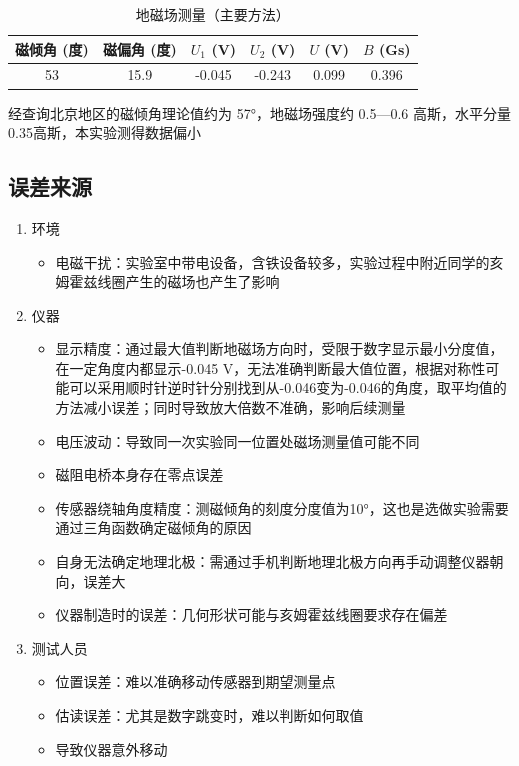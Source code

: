 \documentclass[11pt]{ctexart}
\makeatletter
\providecommand{\tightlist}{%
      \setlength{\itemsep}{0pt}\setlength{\parskip}{0pt}}
\newcommand{\boxspacing}{\kern\kvtcb@left@rule\kern\kvtcb@boxsep}
\newcommand{\prompt}[4]{
        {\ttfamily\llap{{\color{#2}[#3]:\hspace{3pt}#4}}\vspace{-\baselineskip}}
    }
\makeatother
\begin{document}
            \begin{tcolorbox}[breakable, size=fbox, boxrule=.5pt, pad at break*=1mm, opacityfill=0]
\prompt{Out}{outcolor}{14}{\boxspacing}
\begin{table}[H]
\centering
\caption{地磁场测量（主要方法）}
\label{tab:geo1}
\begin{tabular}{c c c c c c}
\toprule
磁倾角 (度) & 磁偏角 (度) & $U_1$ (V) & $U_2$ (V) & $U$ (V) & $B$ (Gs) \\
\midrule
53 & 15.9 & -0.045 & -0.243 & 0.099 & 0.396 \\
\bottomrule
\end{tabular}
\end{table}
\end{tcolorbox}
        
    经查询北京地区的磁倾角理论值约为 57°，地磁场强度约 0.5---0.6
高斯，水平分量0.35高斯，本实验测得数据偏小

    \subsection{误差来源}\label{ux8befux5deeux6765ux6e90}

\begin{enumerate}
\def\labelenumi{\arabic{enumi}.}
\tightlist
\item
  环境

  \begin{itemize}
  \tightlist
  \item
    电磁干扰：实验室中带电设备，含铁设备较多，实验过程中附近同学的亥姆霍兹线圈产生的磁场也产生了影响
  \end{itemize}
\item
  仪器

  \begin{itemize}
  \tightlist
  \item
    显示精度：通过最大值判断地磁场方向时，受限于数字显示最小分度值，在一定角度内都显示-0.045
    V，无法准确判断最大值位置，根据对称性可能可以采用顺时针逆时针分别找到从-0.046变为-0.046的角度，取平均值的方法减小误差；同时导致放大倍数不准确，影响后续测量
  \item
    电压波动：导致同一次实验同一位置处磁场测量值可能不同
  \item
    磁阻电桥本身存在零点误差
  \item
    传感器绕轴角度精度：测磁倾角的刻度分度值为10°，这也是选做实验需要通过三角函数确定磁倾角的原因
  \item
    自身无法确定地理北极：需通过手机判断地理北极方向再手动调整仪器朝向，误差大
  \item
    仪器制造时的误差：几何形状可能与亥姆霍兹线圈要求存在偏差
  \end{itemize}
\item
  测试人员

  \begin{itemize}
  \tightlist
  \item
    位置误差：难以准确移动传感器到期望测量点
  \item
    估读误差：尤其是数字跳变时，难以判断如何取值
  \item
    导致仪器意外移动
  \end{itemize}
\end{enumerate}
\end{document}
